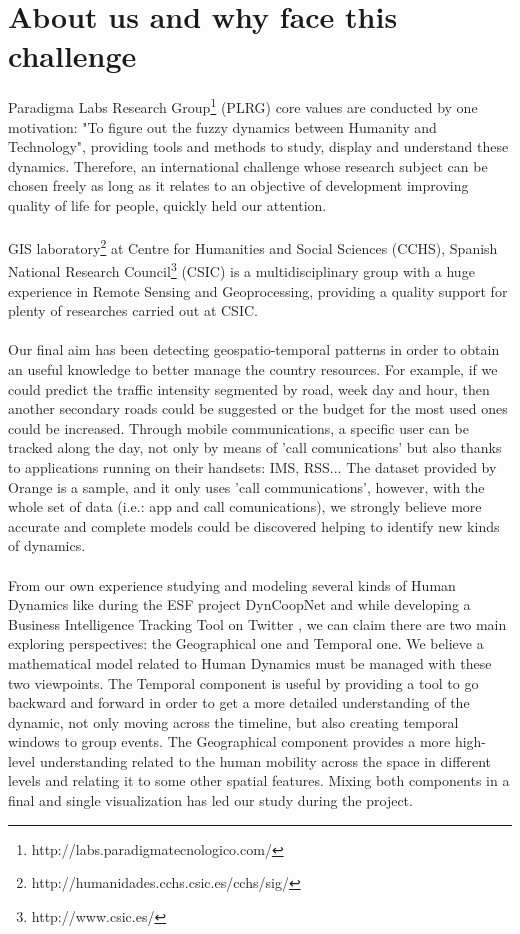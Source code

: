 \newpage

\section{About us and why face this challenge}

Paradigma Labs Research Group\footnote{http://labs.paradigmatecnologico.com/} (PLRG) core values are conducted by one motivation: "To figure out the fuzzy dynamics between Humanity and Technology", providing tools and methods to study, display and understand these dynamics. Therefore, an international challenge whose research subject can be chosen freely as long as it relates to an objective of development improving quality of life for people, quickly held our attention.
\\
\\
GIS laboratory\footnote{http://humanidades.cchs.csic.es/cchs/sig/} at Centre for Humanities and Social Sciences (CCHS), Spanish National Research Council\footnote{http://www.csic.es/} (CSIC) is a multidisciplinary group with a huge experience in Remote Sensing and Geoprocessing, providing a quality support for plenty of researches carried out at CSIC.
\\
\\
Our final aim has been detecting geospatio-temporal patterns in order to obtain an useful knowledge to better manage the country resources. For example, if we could predict the traffic intensity segmented by road, week day and hour, then another secondary roads could be suggested or the budget for the most used ones could be increased. Through mobile communications, a specific user can be tracked along the day, not only by means of 'call comunications' but also thanks to applications running on their handsets: IMS, RSS... The dataset provided by Orange is a sample, and it only uses 'call communications', however, with the whole set of data (i.e.: app and call comunications), we strongly believe more accurate and complete models could be discovered helping to identify new kinds of dynamics.
\\
\\
From our own experience studying and modeling several kinds of Human Dynamics like during the ESF project DynCoopNet\citep{dyncoopnet2012} and while developing a Business Intelligence Tracking Tool on Twitter \citep{labselecciones}, we can claim there are two main exploring perspectives: the Geographical one and Temporal one. We believe a mathematical model related to Human Dynamics must be managed with these two viewpoints. The Temporal component is useful by providing a tool to go backward and forward in order to get a more detailed understanding of the dynamic, not only moving across the timeline, but also creating temporal windows to group events. The Geographical component provides a more high-level understanding related to the human mobility across the space in different levels and relating it to some other spatial features. Mixing both components in a final and single visualization has led our study during the project.
